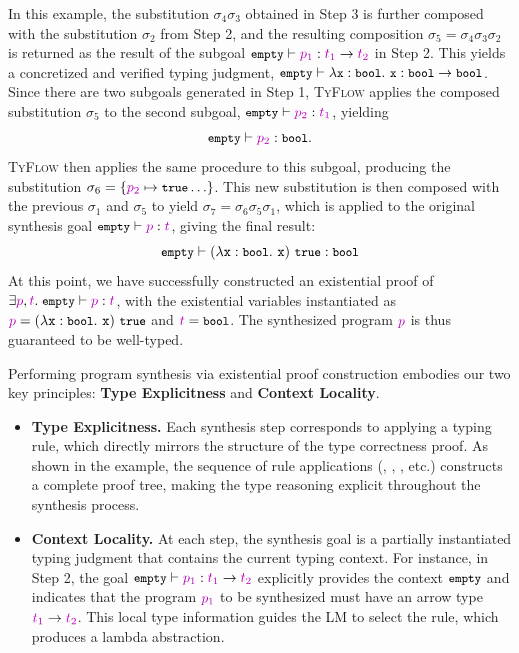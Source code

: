 \documentclass[manuscript,screen]{acmart}
\newcommand{\stlctype}[3]{{#1} \vdash {#2} : {#3}}
\newcommand{\sk}[1]{\textcolor{skunknown}{#1}}
\newcommand{\toolname}[1]{\textsc{#1}}
\newcommand{\tcode}[1]{{\small \texttt{\spaceskip=0.2em #1}}}
\newcommand{\mainname}{\toolname{TyFlow}\xspace}
\begin{document}
In this example, the substitution $\sigma_4\sigma_3$ obtained in Step 3 is further composed with the substitution $\sigma_2$ from Step 2, and the resulting composition $\sigma_5 = \sigma_4\sigma_3\sigma_2$ is returned as the result of the subgoal $\stlctype{\tcode{empty}}{\sk{p_1}}{\arr{\sk{t_1}}{\sk{t_2}}}$ in Step 2. This yields a concretized and verified typing judgment, $\stlctype{\tcode{empty}}{\abs{\tcode{x}}{\tcode{bool}}{\tcode{x}}}{\arr{\tcode{bool}}{\tcode{bool}}}$.
%
Since there are two subgoals generated in Step 1, \mainname applies the composed substitution $\sigma_5$ to the second subgoal, $\stlctype{\tcode{empty}}{\sk{p_2}}{\sk{t_1}}$, yielding
\[
\stlctype{\tcode{empty}}{\sk{p_2}}{\tcode{bool}}.
\]
\mainname then applies the same procedure to this subgoal, producing the substitution 
$\sigma_6=\{\sk{p_2}\mapsto\tcode{true}\ldots\}$. 
This new substitution is then composed with the previous $\sigma_1$ and $\sigma_5$ to yield $\sigma_7=\sigma_6\sigma_5\sigma_1$, which is applied to the original
synthesis goal $\stlctype{\tcode{empty}}{\sk{p}}{\sk{t}}$, giving the final result:
\[
\stlctype{\tcode{empty}}{\app{(\abs{\texttt{x}}{\tcode{bool}}{\texttt{x}})}{\tcode{true}}}{\tcode{bool}}
\]
At this point, we have successfully constructed an existential proof of $\exists \sk{p}, \sk{t}.\; \stlctype{\tcode{empty}}{\sk{p}}{\sk{t}}$, with the existential variables instantiated as $\sk{p} = \app{(\abs{\texttt{x}}{\tcode{bool}}{\texttt{x}})}{\tcode{true}}$ and $\sk{t} = \tcode{bool}$. The synthesized program $\sk{p}$ is thus guaranteed to be well-typed.

Performing program synthesis via existential proof construction embodies our two key principles: \textbf{Type Explicitness} and \textbf{Context Locality}.
\begin{itemize}
    \item \textbf{Type Explicitness.} Each synthesis step corresponds to applying a typing rule, which directly mirrors the structure of the type correctness proof. As shown in the example, the sequence of rule applications (, , , etc.) constructs a complete proof tree, making the type reasoning explicit throughout the synthesis process.
    \item \textbf{Context Locality.} At each step, the synthesis goal is a partially instantiated typing judgment that contains the current typing context. For instance, in Step 2, the goal $\stlctype{\tcode{empty}}{\sk{p_1}}{\arr{\sk{t_1}}{\sk{t_2}}}$ explicitly provides the context $\tcode{empty}$ and indicates that the program $\sk{p_1}$ to be synthesized must have an arrow type $\arr{\sk{t_1}}{\sk{t_2}}$. This local type information guides the LM to select the  rule, which produces a lambda abstraction.
\end{itemize}
 
\end{document}
